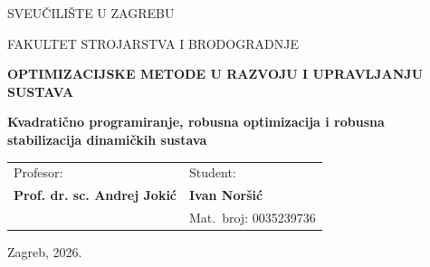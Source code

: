 \documentclass[12pt,a4paper]{article}
\newcommand{\univname}{SVEUČILIŠTE U ZAGREBU}
\newcommand{\facultyname}{FAKULTET STROJARSTVA I BRODOGRADNJE}
\newcommand{\coursename}{OPTIMIZACIJSKE METODE U RAZVOJU I UPRAVLJANJU SUSTAVA}
\newcommand{\seminartitle}{Kvadratično programiranje, robusna optimizacija i robusna stabilizacija dinamičkih sustava}
\newcommand{\professorname}{Prof. dr. sc. Andrej Jokić}
\newcommand{\authorname}{Ivan Noršić}
\newcommand{\studentid}{0035239736}
\newcommand{\locationdate}{Zagreb, 2026.}
\begin{document}
\begin{titlepage}
  \centering
  {\fontsize{14}{17}\selectfont \univname \par}
  {\fontsize{14}{17}\selectfont \facultyname \par}
  \vfill
  {\fontsize{28}{34}\bfseries \coursename \par}
  \vspace{0.8cm}
  {\fontsize{14}{18}\bfseries \seminartitle \par}
  \vfill
  \begin{tabular}{p{}>{\raggedleft\arraybackslash}p{}}
    \textmd{Profesor:} & \textmd{Student:} \\[0.3cm]
    \textbf{\professorname} & \textbf{\authorname} \\[0.25cm]
                            & \textmd{Mat.~broj: \studentid}
  \end{tabular}
  \vspace{1.5cm}
  \par
  {\normalfont \locationdate \par}
\end{titlepage}

\setcounter{page}{1}

\tableofcontents
\clearpage



\setcounter{page}{1}













\clearpage


\clearpage


\end{document}
